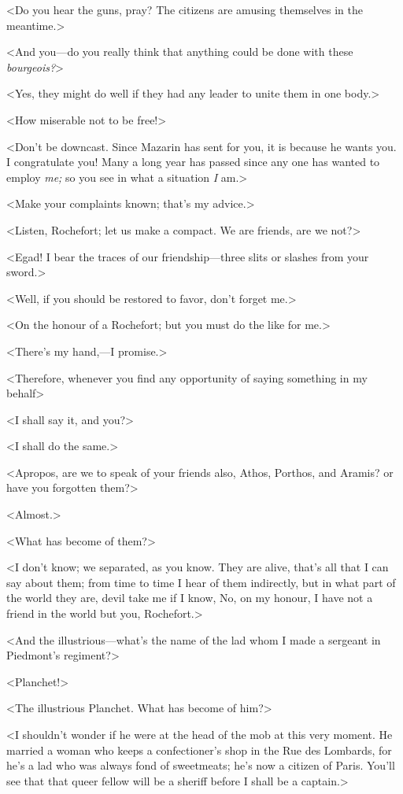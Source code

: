 <Do you hear the guns, pray? The citizens are amusing themselves in the meantime.>

<And you—do you really think that anything could be done with these \textit{bourgeois?}>

<Yes, they might do well if they had any leader to unite them in one body.>

<How miserable not to be free!>

<Don't be downcast. Since Mazarin has sent for you, it is because he wants you. I congratulate you! Many a long year has passed since any one has wanted to employ \textit{me;} so you see in what a situation \textit{I} am.>

<Make your complaints known; that's my advice.>

<Listen, Rochefort; let us make a compact. We are friends, are we not?>

<Egad! I bear the traces of our friendship—three slits or slashes from your sword.>

<Well, if you should be restored to favor, don't forget me.>

<On the honour of a Rochefort; but you must do the like for me.>

<There's my hand,—I promise.>

<Therefore, whenever you find any opportunity of saying something in my behalf\longdash>

<I shall say it, and you?>

<I shall do the same.>

<Apropos, are we to speak of your friends also, Athos, Porthos, and Aramis? or have you forgotten them?>

<Almost.>

<What has become of them?>

<I don't know; we separated, as you know. They are alive, that's all that I can say about them; from time to time I hear of them indirectly, but in what part of the world they are, devil take me if I know, No, on my honour, I have not a friend in the world but you, Rochefort.>

<And the illustrious—what's the name of the lad whom I made a sergeant in Piedmont's regiment?>

<Planchet!>

<The illustrious Planchet. What has become of him?>

<I shouldn't wonder if he were at the head of the mob at this very moment. He married a woman who keeps a confectioner's shop in the Rue des Lombards, for he's a lad who was always fond of sweetmeats; he's now a citizen of Paris. You'll see that that queer fellow will be a sheriff before I shall be a captain.>

